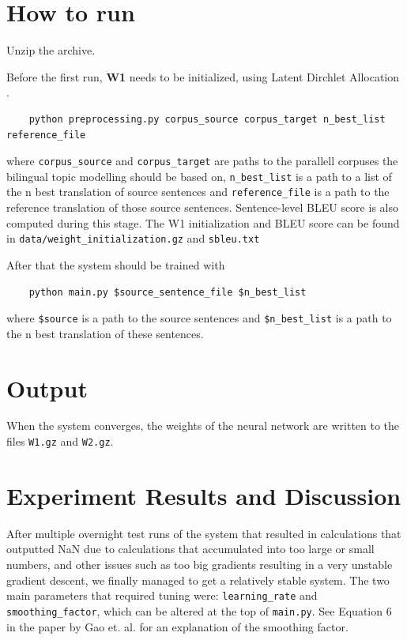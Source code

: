 \documentclass[a4paper]{article}
\begin{document}
\section{How to run}

Unzip the archive.

Before the first run, \textbf{W1} needs to be initialized, using Latent Dirchlet Allocation \cite{ wiki:3}.

\begin{lstlisting}
	python preprocessing.py corpus_source corpus_target n_best_list reference_file
\end{lstlisting}

where \verb|corpus_source| and \verb|corpus_target| are paths to the parallell corpuses the bilingual topic modelling should be based on, \verb|n_best_list| is a path to a list of the n best translation of source sentences and \verb|reference_file| is a path to the reference translation of those source sentences. Sentence-level BLEU score is also computed during this stage. The W1 initialization and BLEU score can be found in \verb|data/weight_initialization.gz| and \verb|sbleu.txt|

After that the system should be trained with
\begin{lstlisting}
	python main.py $source_sentence_file $n_best_list
\end{lstlisting}

where \verb|$source| is a path to the source sentences and \verb|$n_best_list| is a path to the n best translation of these sentences.

\section{Output}

When the system converges, the weights of the neural network are written to the files \verb|W1.gz| and \verb|W2.gz|.

\section{Experiment Results and Discussion}

After multiple overnight test runs of the system that resulted in calculations that outputted NaN due to calculations that accumulated into too large or small numbers, and other issues such as too big gradients resulting in a very unstable gradient descent, we finally managed to get a relatively stable system. The two main parameters that required tuning were: \verb|learning_rate| and \verb|smoothing_factor|, which can be altered at the top of \verb|main.py|. See Equation 6 in the paper by Gao et. al. \cite{gao2014learning} for an explanation of the smoothing factor.
\end{document}
